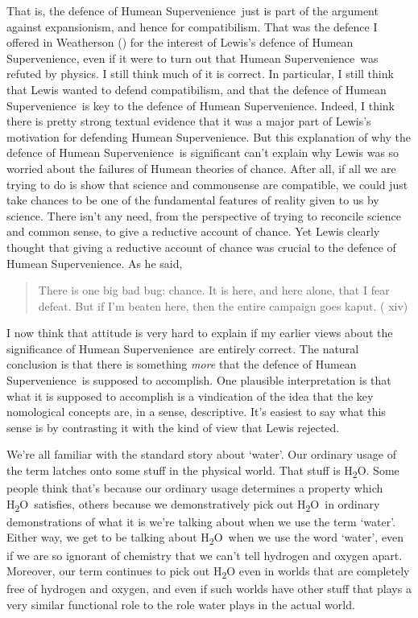 \documentclass[
  11pt,
  letterpaper,
  DIV=11,
  numbers=noendperiod,
  twoside]{scrartcl}
\begin{document}
That is, the defence of Humean Supervenience~just is part of the
argument against expansionism, and hence for compatibilism. That was the
defence I offered in Weatherson
() for the interest of Lewis's
defence of Humean Supervenience, even if it were to turn out that Humean
Supervenience~was refuted by physics. I still think much of it is
correct. In particular, I still think that Lewis wanted to defend
compatibilism, and that the defence of Humean Supervenience~is key to
the defence of Humean Supervenience. Indeed, I think there is pretty
strong textual evidence that it was a major part of Lewis's motivation
for defending Humean Supervenience. But this explanation of why the
defence of Humean Supervenience~is significant can't explain why Lewis
was so worried about the failures of Humean theories of chance. After
all, if all we are trying to do is show that science and commonsense are
compatible, we could just take chances to be one of the fundamental
features of reality given to us by science. There isn't any need, from
the perspective of trying to reconcile science and common sense, to give
a reductive account of chance. Yet Lewis clearly thought that giving a
reductive account of chance was crucial to the defence of Humean
Supervenience. As he said,

\begin{quote}
There is one big bad bug: chance. It is here, and here alone, that I
fear defeat. But if I'm beaten here, then the entire campaign goes
kaput. ( xiv)
\end{quote}

I now think that attitude is very hard to explain if my earlier views
about the significance of Humean Supervenience~are entirely correct. The
natural conclusion is that there is something \emph{more} that the
defence of Humean Supervenience~is supposed to accomplish. One plausible
interpretation is that what it is supposed to accomplish is a
vindication of the idea that the key nomological concepts are, in a
sense, descriptive. It's easiest to say what this sense is by
contrasting it with the kind of view that Lewis rejected.

We're all familiar with the standard story about `water'. Our ordinary
usage of the term latches onto some stuff in the physical world. That
stuff is H\textsubscript{2}O. Some people think that's because our
ordinary usage determines a property which
H\textsubscript{2}O~satisfies, others because we demonstratively pick
out H\textsubscript{2}O~in ordinary demonstrations of what it is we're
talking about when we use the term `water'. Either way, we get to be
talking about H\textsubscript{2}O~when we use the word `water', even if
we are so ignorant of chemistry that we can't tell hydrogen and oxygen
apart. Moreover, our term continues to pick out H\textsubscript{2}O even
in worlds that are completely free of hydrogen and oxygen, and even if
such worlds have other stuff that plays a very similar functional role
to the role water plays in the actual world.
\end{document}
